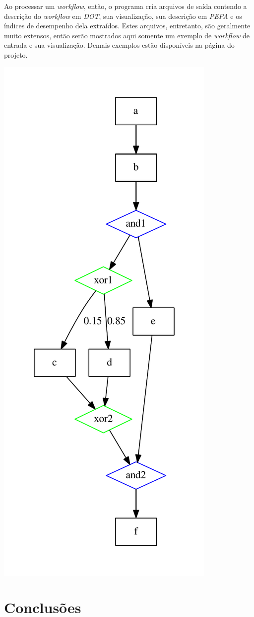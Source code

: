 \documentclass[a4paper,11pt]{article}
\begin{document}
        Ao processar um \emph{workflow}, então, o programa cria arquivos de saída contendo a descrição do \emph{workflow} em \emph{DOT}, sua visualização, sua descrição em \emph{PEPA} e os índices de desempenho dela extraídos. Estes arquivos, entretanto, são geralmente muito extensos, então serão mostrados aqui somente um exemplo de \emph{workflow} de entrada e sua visualização. Demais exemplos estão disponíveis na página do projeto.\\

        \begin{minipage}[c]{0.6\textwidth}
            \centering
            
        \end{minipage}%
        \begin{minipage}[r]{0.4\textwidth}
            \centering
            \includegraphics[width=0.65\linewidth]{example.pdf}
            \label{fig:pdf}
        \end{minipage}

    \section*{Conclusões}

    
    
\end{document}
